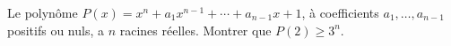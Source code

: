 Le polynôme $P(x) = x^n + a_1x^{n-1} + \cdots + a_{n-1}x + 1$, à coefficients $a_1, \ldots, a_{n-1}$ positifs ou nuls, a $n$ racines réelles. Montrer que $P(2) \geq 3^n$.
